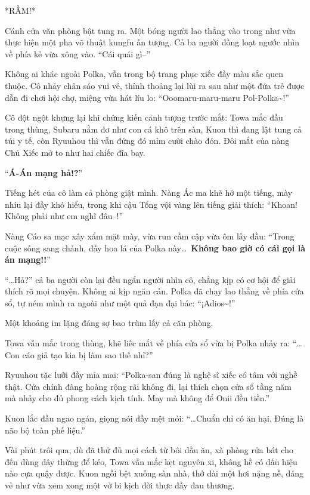 \documentclass[../main.tex]{subfiles}
\begin{document}
*RẦM!*

Cánh cửa văn phòng bật tung ra. Một bóng người lao thẳng vào trong như vừa thực hiện một pha võ thuật kungfu ấn tượng. Cả ba người đồng loạt ngước nhìn về phía kẻ vừa xông vào. ``Cái quái gì--''

Không ai khác ngoài Polka, vẫn trong bộ trang phục xiếc đầy màu sắc quen thuộc. Cô nhảy chân sáo vui vẻ, thỉnh thoảng lại lùi ra sau như một đứa trẻ được dẫn đi chơi hội chợ, miệng vừa hát líu lo: ``Ooomaru-maru-maru Pol-Polka\~{}!''


Cô đột ngột khựng lại khi chứng kiến cảnh tượng trước mắt: Towa mắc đầu trong thùng, Subaru nằm đơ như con cá khô trên sàn, Kuon thì đang lật tung cả túi y tế, còn Ryuuhou thì vẫn đứng đó mỉm cười chào đón. Đôi mắt của nàng Chủ Xiếc mở to như hai chiếc đĩa bay.

``\textbf{Á-Án mạng hả!?}''

Tiếng hét của cô làm cả phòng giật mình. Nàng Ác ma khẽ hở một tiếng, mày nhíu lại đầy khó hiểu, trong khi cậu Tổng vội vàng lên tiếng giải thích: ``Khoan! Không phải như em nghĩ đâu--!''

Nàng Cáo sa mạc xây xẩm mặt mày, vừa run cầm cập vừa ôm lấy đầu: ``Trong cuộc sống sang chảnh, đầy hoa lá của Polka này\dots\ \textbf{Không bao giờ có cái gọi là án mạng!!}''

``\dots Hả?'' cả ba người còn lại đều ngẩn người nhìn cô, chẳng kịp có cơ hội để giải thích rõ mọi chuyện. Không ai kịp ngăn cản. Polka đã chạy lao thẳng về phía cửa sổ, tự ném mình ra ngoài như một quả đạn đại bác: ``¡Adios\~{}!''

Một khoảng im lặng đáng sợ bao trùm lấy cả căn phòng.

Towa vẫn mắc trong thùng, khẽ liếc mắt về phía cửa sổ vừa bị Polka nhảy ra: ``\dots Con cáo giả tạo kia bị làm sao thế nhỉ?''

Ryuuhou tặc lưỡi đầy mỉa mai: ``Polka-san đúng là nghệ sĩ xiếc có tâm với nghề thật. Cửa chính đàng hoàng rộng rãi không đi, lại thích chọn cửa sổ tầng năm mà nhảy cho đủ phong cách kịch tính. May mà không để Onii đền tiền.''

Kuon lắc đầu ngao ngán, giọng nói đầy mệt mỏi: ``\dots Chuẩn chỉ có ăn hại. Đúng là não bộ toàn phế liệu.''

\ct

Vài phút trôi qua, dù đã thử đủ mọi cách từ bôi dầu ăn, xà phòng rửa bát cho đến dùng dây thừng để kéo, Towa vẫn mắc kẹt nguyên xi, không hề có dấu hiệu nào cựa quậy được. Kuon ngồi bệt xuống sàn nhà, thở dài một hơi nặng nề, dáng vẻ như vừa xem xong một vở bi kịch đời thực đầy đau thương.
\end{document}
